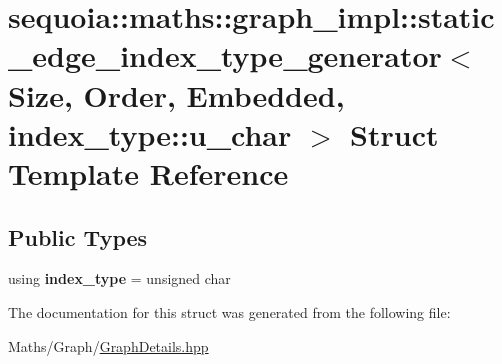 \hypertarget{structsequoia_1_1maths_1_1graph__impl_1_1static__edge__index__type__generator_3_01_size_00_01_or7ffb8ded61fe20546e7d88be9c738f13}{}\section{sequoia\+::maths\+::graph\+\_\+impl\+::static\+\_\+edge\+\_\+index\+\_\+type\+\_\+generator$<$ Size, Order, Embedded, index\+\_\+type\+::u\+\_\+char $>$ Struct Template Reference}
\label{structsequoia_1_1maths_1_1graph__impl_1_1static__edge__index__type__generator_3_01_size_00_01_or7ffb8ded61fe20546e7d88be9c738f13}
\subsection*{Public Types}
\begin{DoxyCompactItemize}
\item 
\mbox{\label{structsequoia_1_1maths_1_1graph__impl_1_1static__edge__index__type__generator_3_01_size_00_01_or7ffb8ded61fe20546e7d88be9c738f13_ab0d89565c42298e416c8969c88532a14}} 
using {\bfseries index\+\_\+type} = unsigned char
\end{DoxyCompactItemize}


The documentation for this struct was generated from the following file\+:\begin{DoxyCompactItemize}
\item 
Maths/\+Graph/\mbox{\hyperlink{_graph_details_8hpp}{Graph\+Details.\+hpp}}\end{DoxyCompactItemize}
